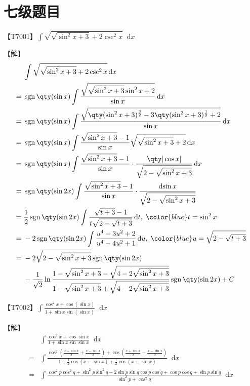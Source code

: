 \documentclass{ctexbook}
\DeclareMathOperator{\sgn}{sgn}
\newcommand*{\dif}{\mathop{}\!\mathrm{d}}
\begin{document}
{\chapter*{七级题目}
【T7001】$\int\sqrt{\sqrt{\sin^{2}{x}+3}+2\csc^{2}{x}}\dif{x}$\par
【解】
\begin{align*}
{}&\int\sqrt{\sqrt{\sin^{2}{x}+3}+2\csc^{2}{x}}\dif{x}\\
={}&\sgn{\qty(\sin{x})}\int\frac{\sqrt{\sqrt{\sin^{2}{x}+3}\sin^{2}{x}+2}}{\sin{x}}\dif{x}\\
={}&\sgn{\qty(\sin{x})}\int\frac{\sqrt{\qty(\sin^{2}{x}+3)^{\frac{3}{2}}-3\qty(\sin^{2}{x}+3)^{\frac{1}{2}}+2}}{\sin{x}}\dif{x}\\
={}&\sgn{\qty(\sin{x})}\int\frac{\sqrt{\sin^{2}{x}+3}-1}{\sin{x}}\sqrt{\sqrt{\sin^{2}{x}+3}+2}\dif{x}\\
={}&\sgn{\qty(\sin{x})}\int\frac{\sqrt{\sin^{2}{x}+3}-1}{\sin{x}}\cdot\frac{\qty|\cos{x}|}{\sqrt{2-\sqrt{\sin^{2}{x}+3}}}\dif{x}\\
={}&\sgn{\qty(\sin{2x})}\int\frac{\sqrt{\sin^{2}{x}+3}-1}{\sin{x}}\cdot\frac{\dif{\sin{x}}}{\sqrt{2-\sqrt{\sin^{2}{x}+3}}}\\
={}&\frac{1}{2}\sgn{\qty(\sin{2x})}\int\frac{\sqrt{t+3}-1}{t\sqrt{2-\sqrt{t+3}}}\dif{t},\;{\color{blue}t=\sin^{2}{x}}\\
={}&-2\sgn{\qty(\sin{2x})}\int\frac{u^{4}-3u^{2}+2}{u^{4}-4u^{2}+1}\dif{u},\;{\color{blue}u=\sqrt{2-\sqrt{t+3}}}\\
={}&-2\sqrt{2-\sqrt{\sin^{2}{x}+3}}\sgn{\qty(\sin{2x})}\\
{}&-\frac{1}{\sqrt{2}}\ln{\frac{1-\sqrt{\sin^{2}{x}+3}-\sqrt{4-2\sqrt{\sin^{2}{x}+3}}}{1-\sqrt{\sin^{2}{x}+3}+\sqrt{4-2\sqrt{\sin^{2}{x}+3}}}}\sgn{\qty(\sin{2x})}+C
\end{align*}\par
【T7002】$\int\frac{\cos^{2}{x}+\cos(\sin{x})}{1+\sin{x}\sin(\sin{x})}\dif{x}$\par
【解】
\begin{align*}
{}&\int\frac{\cos^{2}{x}+\cos{\sin{x}}}{1+\sin{x}\sin{\sin{x}}}\dif{x}\\
={}&\int\frac{\cos^{2}(\frac{x+\sin{x}}{2}+\frac{x-\sin{x}}{2})+\cos(\frac{x+\sin{x}}{2}-\frac{x-\sin{x}}{2})}{1+\frac{1}{2}\cos(x-\sin{x})+\frac{1}{2}\cos(x+\sin{x})}\dif{x}\\
={}&\int\frac{\cos^{2}{p}\cos^{2}{q}+\sin^{2}{p}\sin^{2}{q}-2\sin{p}\sin{q}\cos{p}\cos{q}+\cos{p}\cos{q}+\sin{p}\sin{q}}{\sin^{2}{p}+\cos^{2}{q}}\dif{x}\\

\end{align*}}
\end{document}
